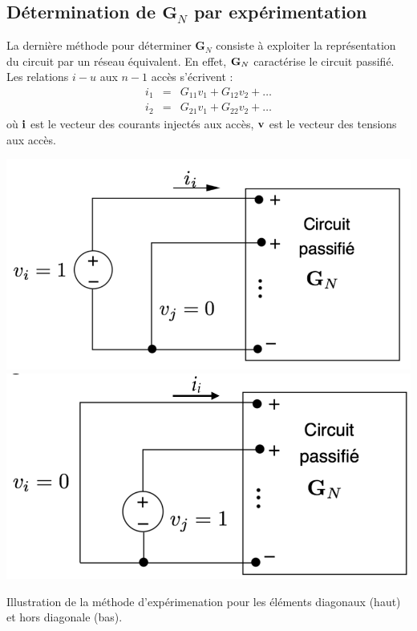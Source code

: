 \subsection{Détermination de $\mathbf{G}_N$ par expérimentation}
La dernière méthode pour déterminer $\mathbf{G}_N$ consiste à exploiter la représentation du circuit par un réseau équivalent. En effet, ${\bf G}_N$ caractérise le circuit passifié. Les relations $i-u$ aux $n-1$ accès s'écrivent : 
\begin{eqnarray*}
	i_{1} & = & G_{11}v_{1} + G_{12}v_{2}+ \ldots \\
	i_{2} & = & G_{21}v_{1} + G_{22}v_{2}+ \ldots 
\end{eqnarray*}
où ${\bf i}$ est le vecteur des courants injectés aux
accès, ${\bf v}$ est le vecteur des tensions aux accès.
\begin{marginfigure}[-2cm]
	\centering
	\includegraphics[width=\linewidth]{figs/methodes-generales/experimentation_ii} 
	\includegraphics[width=0.95\linewidth]{figs/methodes-generales/experimentation_ij}
	\caption{Illustration de la méthode d'expérimenation pour les éléments diagonaux (haut) et hors diagonale (bas).}
	\label{fig:experimentation}
\end{marginfigure}

